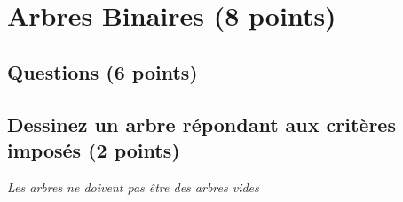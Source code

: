 \documentclass[11pt,a4paper]{article}
\begin{document}


\vspace*{-0.75cm}


\section{Arbres Binaires (8 points)}

\subsection*{Questions (6 points) }

\subsection{Dessinez un arbre répondant aux critères imposés (2 points) }

\begin{center}
\textit{Les arbres ne doivent pas être des arbres vides}
\end{center}

\vspace{-0.5cm}
\end{document}

